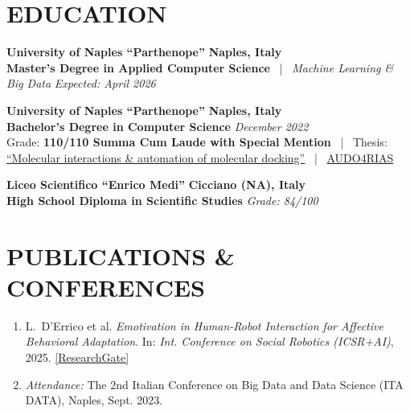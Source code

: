 \documentclass[10pt,a4paper]{article}
\begin{document}
\section*{EDUCATION}

\noindent
{\small\textbf{\textcolor{primary}{University of Naples ``Parthenope''}}} \hfill {\small\textbf{Naples, Italy}}\\
{\small\textbf{Master's Degree in Applied Computer Science} \ \textcolor{secondary}{|} \ \textit{Machine Learning \& Big Data}} \hfill {\small\textit{\textcolor{secondary}{Expected: April 2026}}}

\vspace{3pt}\noindent
{\small\textbf{\textcolor{primary}{University of Naples ``Parthenope''}}} \hfill {\small\textbf{Naples, Italy}}\\
{\small\textbf{Bachelor's Degree in Computer Science}} \hfill {\small\textit{\textcolor{secondary}{December 2022}}}\\
{\footnotesize Grade: \textbf{110/110 Summa Cum Laude with Special Mention} \ \textcolor{secondary}{|} \
Thesis: \href{https://github.com/mungowz/Bachelor-thesis}{\textcolor{accent}{``Molecular interactions \& automation of molecular docking''}} \ \textcolor{secondary}{|} \
\href{https://github.com/mungowz/AUDO4RIAS}{\textcolor{accent}{AUDO4RIAS}}}

\vspace{3pt}\noindent
{\small\textbf{\textcolor{primary}{Liceo Scientifico ``Enrico Medi''}}} \hfill {\small\textbf{Cicciano (NA), Italy}}\\
{\small\textbf{High School Diploma in Scientific Studies}} \hfill {\small\textit{\textcolor{secondary}{Grade: 84/100}}}

\section*{PUBLICATIONS \& CONFERENCES}
\begin{enumerate}\small
  \item L.~D'Errico et al. \textit{Emotivation in Human-Robot Interaction for Affective Behavioral Adaptation}. In: \textit{Int. Conference on Social Robotics (ICSR+AI)}, 2025. \href{https://www.researchgate.net/publication/399369176_Emotivation_in_Human-Robot_Interaction_for_Affective_Behavioral_Adaptation}{\textcolor{accent}{[ResearchGate]}}
  \item \textit{Attendance:} The 2nd Italian Conference on Big Data and Data Science (ITA DATA), Naples, Sept. 2023.
\end{enumerate}
\end{document}
